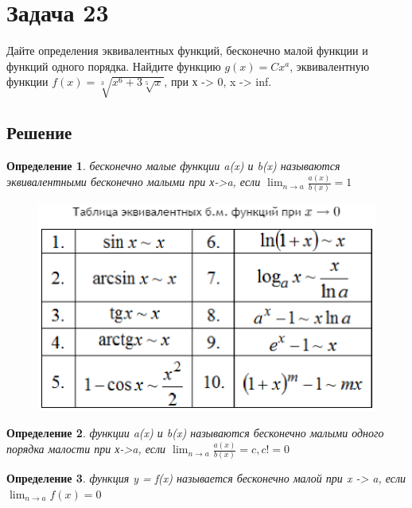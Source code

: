 \documentclass[a4paper,12pt]{article}
\newtheorem*{defi}{Определение}
\begin{document}
    \section*{Задача 23}
    
    Дайте определения эквивалентных функций, бесконечно малой функции и функций одного порядка. Найдите функцию $g(x) = Cx^a$, эквивалентную функции $f(x)= \sqrt[3]{x^6+3\sqrt[5]{x}}$, при х -> 0, x -> inf.
    
    \subsection*{Решение}
    
    \begin{defi} бесконечно малые функции a(x) и b(x) называются эквивалентными бесконечно малыми при х->a, если
    $\displaystyle \lim_{n\rightarrow a}
                   \frac{a(x)}{b(x)}
                   =1
    $ 
    \end{defi}
    \begin{figure}[h!]
    \includegraphics[width=1\linewidth]{_PNG}
    \end{figure}
    \clearpage
    \begin{defi}  функции a(x) и b(x) называются бесконечно малыми одного порядка малости при х->a, если
    $\displaystyle \lim_{n\rightarrow a} 
                   \frac{a(x)}{b(x)}
                   =c, c != 0
    $              
    
    \end{defi}
    \begin{defi} функция y = f(x) называется бесконечно малой при x -> a, если
    $\displaystyle \lim_{n\rightarrow a} 
                   f(x) = 0
    $
                 
    \end{defi}
    
\end{document}
